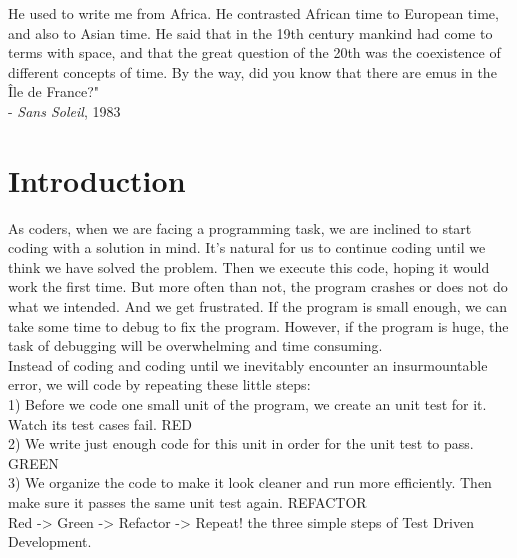 \documentclass{42-en}
\begin{document}
    He used to write me from Africa. He contrasted African time to European time, and also to Asian time. He said that in the 19th century mankind had come to terms with space, and that the great question of the 20th was the coexistence of different concepts of time. By the way, did you know that there are emus in the Île de France?"\\
    
    - \textit{Sans Soleil}, 1983\\

\chapter{Introduction}

As coders, when we are facing a programming task, we are inclined to start coding with a solution in mind. It's natural for us to continue coding until we think we have solved the problem. Then we execute this code, hoping it would work the first time. But more often than not, the program crashes or does not do what we intended. And we get frustrated. If the program is small enough, we can take some time to debug to fix the program. However, if the program is huge, the task of debugging will be overwhelming and time consuming.\\
    
Instead of coding and coding until we inevitably encounter an insurmountable error, we will code by repeating these little steps: \\
    1) Before we code one small unit of the program, we create an unit test for it. Watch its test cases fail. RED \\
    2) We write just enough code for this unit in order for the unit test to pass. GREEN \\
    3) We organize the code to make it look cleaner and run more efficiently. Then make sure it passes the same unit test again. REFACTOR \\
    
Red -> Green -> Refactor -> Repeat! the three simple steps of Test Driven Development. 
\end{document}
